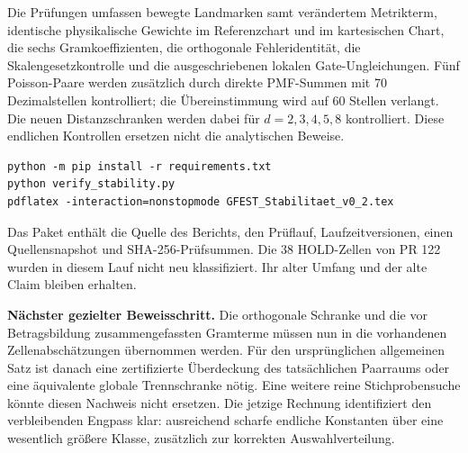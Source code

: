 \documentclass[11pt,a4paper]{article}
\begin{document}
Die Prüfungen umfassen bewegte Landmarken samt verändertem Metrikterm, identische physikalische Gewichte im Referenzchart und im kartesischen Chart, die sechs Gramkoeffizienten, die orthogonale Fehleridentität, die Skalengesetzkontrolle und die ausgeschriebenen lokalen Gate-Ungleichungen. Fünf Poisson-Paare werden zusätzlich durch direkte PMF-Summen mit 70 Dezimalstellen kontrolliert; die Übereinstimmung wird auf 60 Stellen verlangt. Die neuen Distanzschranken werden dabei für $d=2,3,4,5,8$ kontrolliert. Diese endlichen Kontrollen ersetzen nicht die analytischen Beweise.

\begin{verbatim}
python -m pip install -r requirements.txt
python verify_stability.py
pdflatex -interaction=nonstopmode GFEST_Stabilitaet_v0_2.tex
\end{verbatim}
Das Paket enthält die Quelle des Berichts, den Prüflauf, Laufzeitversionen, einen Quellensnapshot und SHA-256-Prüfsummen. Die 38 HOLD-Zellen von PR 122 wurden in diesem Lauf nicht neu klassifiziert. Ihr alter Umfang und der alte Claim bleiben erhalten.

\textbf{Nächster gezielter Beweisschritt.} Die orthogonale Schranke und die vor Betragsbildung zusammengefassten Gramterme müssen nun in die vorhandenen Zellenabschätzungen übernommen werden. Für den ursprünglichen allgemeinen Satz ist danach eine zertifizierte Überdeckung des tatsächlichen Paarraums oder eine äquivalente globale Trennschranke nötig. Eine weitere reine Stichprobensuche könnte diesen Nachweis nicht ersetzen. Die jetzige Rechnung identifiziert den verbleibenden Engpass klar: ausreichend scharfe endliche Konstanten über eine wesentlich größere Klasse, zusätzlich zur korrekten Auswahlverteilung.
\end{document}
